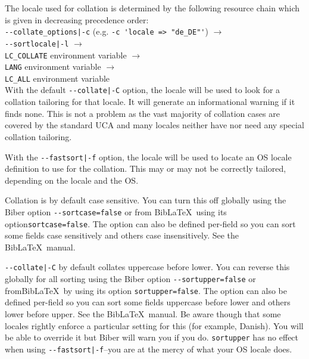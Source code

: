 \documentclass{ltxdockit}
\begin{document}
\noindent The locale used for collation is determined by the following resource
chain which is given in decreasing precedence order:\\[2ex]

\noindent\verb+--collate_options|-c+ (e.g. \verb+-c 'locale => "de_DE"'+) $\rightarrow$\\
\hspace*{1em}\verb+--sortlocale|-l+ $\rightarrow$\\
\hspace*{2em}\verb+LC_COLLATE+ environment variable $\rightarrow$\\
\hspace*{3em}\verb+LANG+ environment variable $\rightarrow$\\
\hspace*{4em}\verb+LC_ALL+ environment variable\\[2ex]

\noindent With the default \verb+--collate|-C+ option, the locale will
be used to look for a collation tailoring for that locale. It will generate an
informational warning if it finds none. This is not a problem as the vast
majority of collation cases are covered by the standard UCA and many
locales neither have nor need any special collation tailoring.

With the \verb+--fastsort|-f+ option, the locale will be
used to locate an OS locale definition to use for the collation. This
may or may not be correctly tailored, depending on the locale and the OS.

Collation is by default case sensitive. You can turn this
off globally using the Biber option \verb+--sortcase=false+ or from
Bib\LaTeX\ using its option\linebreak[4]\verb+sortcase=false+. The option can also
be defined per-field so you can sort some fields case sensitively and
others case insensitively. See the Bib\LaTeX\ manual.

\verb+--collate|-C+ by default collates uppercase before lower.
You can reverse this globally for all sorting using the Biber option
\verb+--sortupper=false+ or from\linebreak[4]Bib\LaTeX\ by using its option
\verb+sortupper=false+. The option can also be defined per-field so you can
sort some fields uppercase before lower and others lower before upper. See the
Bib\LaTeX\ manual. Be aware though that some locales rightly enforce a
particular setting for this (for example, Danish). You will be able to
override it but Biber will warn you if you do. \verb+sortupper+ has
no effect when using \verb+--fastsort|-f+--you are at the mercy of what
your OS locale does.
\end{document}
